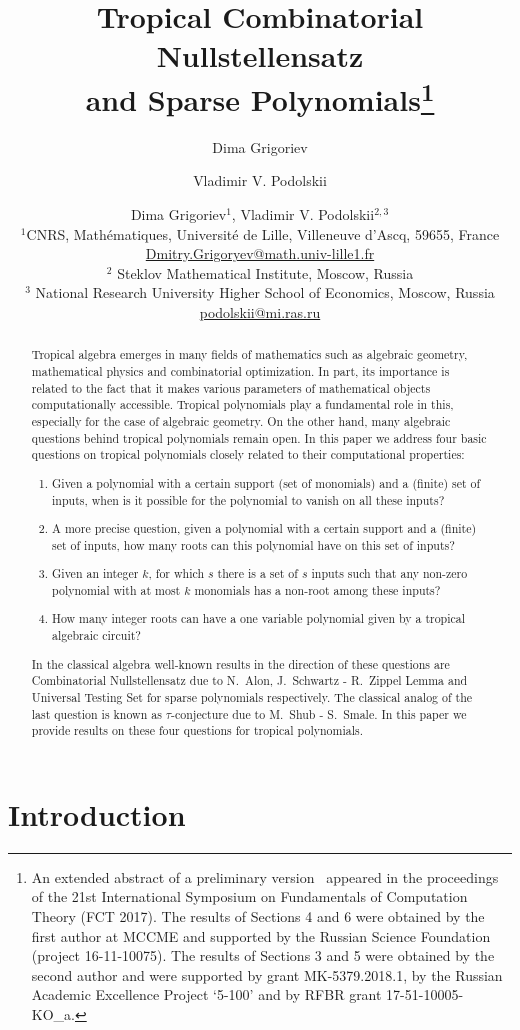 \documentclass[11pt]{article}
\title{Tropical Combinatorial Nullstellensatz\\ and Sparse Polynomials\footnote{An extended abstract of a preliminary version~\cite{GrigorievP17} appeared in the proceedings of the 21st International Symposium on Fundamentals of Computation Theory (FCT 2017).\newline
The results of Sections 4 and 6 were obtained by the first author  at MCCME and supported by the Russian Science Foundation (project 16-11-10075). The results of Sections 3 and 5 were obtained by the second author and were supported by grant MK-5379.2018.1, by the
Russian Academic Excellence Project `5-100' and by RFBR grant 17-51-10005-KO\_a. }}
\author{Dima Grigoriev \and Vladimir V. Podolskii}
\author{Dima Grigoriev$^1$, Vladimir V. Podolskii$^{2,3}$\\[3pt]
$^1$\small CNRS, Math\'ematiques, Universit\'e de Lille, Villeneuve d'Ascq, 59655, France\\
\small \href{mailto:Dmitry.Grigoryev@math.univ-lille1.fr}{Dmitry.Grigoryev@math.univ-lille1.fr}\\
$^2$ \small Steklov Mathematical Institute, Moscow, Russia\\
$^3$ \small National Research University Higher School of Economics, Moscow, Russia\\
 \small   \href{mailto:podolskii@mi.ras.ru}{podolskii@mi.ras.ru}
}
\date{}
\begin{document}
\maketitle

\begin{abstract}
Tropical algebra emerges in many fields of mathematics such as algebraic geometry, mathematical physics and combinatorial optimization. In part, its importance is related to the fact that it makes various parameters of mathematical objects computationally accessible. Tropical polynomials play a fundamental role in this, especially for the case of algebraic geometry. On the other hand, many algebraic questions behind tropical polynomials remain open.
In this paper we address four basic questions on tropical polynomials closely related to their computational properties:
\begin{enumerate}
\item Given a polynomial with a certain support (set of monomials) and a (finite) set of inputs, when is it possible for the polynomial to vanish on all these inputs?
\item A more precise question, given a polynomial with a certain support and a (finite) set of inputs, how many roots can this polynomial have on this set of inputs?
\item Given an integer $k$, for which $s$ there is a set of $s$ inputs such that any non-zero polynomial with at most $k$ monomials has a non-root among these inputs?
\item How many integer roots can have a one variable polynomial given by a tropical algebraic circuit?
\end{enumerate}
In the classical algebra well-known results in the direction of these questions are Combinatorial Nullstellensatz due to N.~Alon, J.~Schwartz - R.~Zippel Lemma and Universal Testing Set for sparse polynomials respectively. The classical analog of the last question is known as $\tau$-conjecture due to M.~Shub - S.~Smale.
In this paper we provide results on these four questions for tropical polynomials.

\end{abstract}


\tableofcontents

\section{Introduction}
\end{document}
